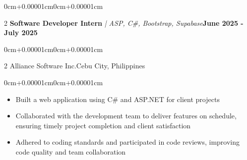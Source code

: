 \documentclass[10pt, letterpaper]{article}
\newenvironment{highlights}{\begin{itemize}[topsep=0.10cm,parsep=0.10cm,partopsep=0pt,itemsep=0pt,leftmargin=0cm+10pt]}{\end{itemize}}
\newenvironment{onecolentry}{\begin{adjustwidth}{0cm+0.00001cm}{0cm+0.00001cm}}{\end{adjustwidth}}
\newenvironment{twocolentry}[2][]{\onecolentry\def\secondColumn{#2}\setcolumnwidth{\fill,5cm}\begin{paracol}{2}}{\switchcolumn \raggedleft \secondColumn\end{paracol}\endonecolentry}
\begin{document}
    \begin{twocolentry}{\textbf{June 2025 - July 2025}}
    \textbf{Software Developer Intern}\textit{ | ASP, C\#, Bootstrap, Supabase}\end{twocolentry}
    \vspace{0.05cm}
    \begin{twocolentry}{Cebu City, Philippines}
    Alliance Software Inc.\end{twocolentry}
    \vspace{0.10cm}
    \begin{onecolentry}
        \begin{highlights}
            \item Built a web application using C\# and ASP.NET for client projects
            \item Collaborated with the development team to deliver features on schedule, ensuring timely project completion and client satisfaction
            \item Adhered to coding standards and participated in code reviews, improving code quality and team collaboration
        \end{highlights}
    \end{onecolentry}
    \vspace{0.15cm}
\end{document}
